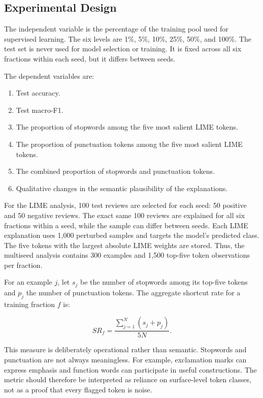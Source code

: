 \documentclass[11pt]{article}
\begin{document}
\subsection{Experimental Design}

The independent variable is the percentage of the training pool used for supervised learning. The six levels are 1\%, 5\%, 10\%, 25\%, 50\%, and 100\%. The test set is never used for model selection or training. It is fixed across all six fractions within each seed, but it differs between seeds.

The dependent variables are:

\begin{enumerate}[label=\arabic*.]
    \item Test accuracy.
    \item Test macro-F1.
    \item The proportion of stopwords among the five most salient LIME tokens.
    \item The proportion of punctuation tokens among the five most salient LIME tokens.
    \item The combined proportion of stopwords and punctuation tokens.
    \item Qualitative changes in the semantic plausibility of the explanations.
\end{enumerate}

For the LIME analysis, 100 test reviews are selected for each seed: 50 positive and 50 negative reviews. The exact same 100 reviews are explained for all six fractions within a seed, while the sample can differ between seeds. Each LIME explanation uses 1,000 perturbed samples and targets the model's predicted class. The five tokens with the largest absolute LIME weights are stored. Thus, the multiseed analysis contains 300 examples and 1,500 top-five token observations per fraction.

For an example $j$, let $s_j$ be the number of stopwords among its top-five tokens and $p_j$ the number of punctuation tokens. The aggregate shortcut rate for a training fraction $f$ is:

\begin{equation}
SR_f = \frac{\sum_{j=1}^{N}(s_j+p_j)}{5N}.
\end{equation}

This measure is deliberately operational rather than semantic. Stopwords and punctuation are not always meaningless. For example, exclamation marks can express emphasis and function words can participate in useful constructions. The metric should therefore be interpreted as reliance on surface-level token classes, not as a proof that every flagged token is noise.
\end{document}
